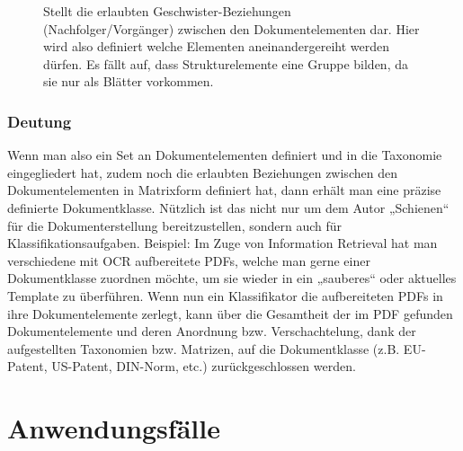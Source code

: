  
\begin{figure}[h!]
\centering
\advance\leftskip-2.5cm
\caption{ Stellt die erlaubten Geschwister-Beziehungen (Nachfolger/Vorgänger) zwischen den Dokumentelementen dar. Hier wird also definiert welche Elementen aneinandergereiht werden dürfen. Es fällt auf, dass Strukturelemente eine Gruppe bilden, da sie nur als Blätter vorkommen. }\label{matrixgeschwister}
\end{figure}
 
\subsection{Deutung}\label{}
 
Wenn man also ein Set an Dokumentelementen definiert und in die Taxonomie eingegliedert hat, zudem noch die erlaubten Beziehungen zwischen den Dokumentelementen in Matrixform definiert hat, dann erhält man eine präzise definierte Dokumentklasse. Nützlich ist das nicht nur um dem Autor „Schienen“ für die Dokumenterstellung bereitzustellen, sondern auch für Klassifikationsaufgaben. Beispiel: Im Zuge von Information Retrieval hat man verschiedene mit OCR aufbereitete PDFs, welche man gerne einer Dokumentklasse zuordnen möchte, um sie wieder in ein „sauberes“ oder aktuelles Template zu überführen. Wenn nun ein Klassifikator die aufbereiteten PDFs in ihre Dokumentelemente zerlegt, kann über die Gesamtheit der im PDF gefunden Dokumentelemente und deren Anordnung bzw. Verschachtelung, dank der aufgestellten Taxonomien bzw. Matrizen, auf die Dokumentklasse (z.B. EU-Patent, US-Patent, DIN-Norm, etc.) zurückgeschlossen werden.

 
\chapter{Anwendungsfälle}\label{}
 
